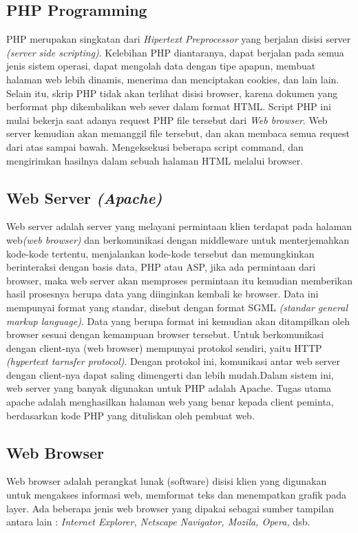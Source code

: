 \documentclass{jtetiproposalskripsi}
\begin{document}
\subsection{PHP Programming }
PHP merupakan singkatan dari \textit{Hipertext Preprocessor} yang berjalan disisi server \textit{(server side scripting)}. Kelebihan PHP diantaranya, dapat berjalan pada semua jenis sistem operasi, dapat mengolah data dengan tipe apapun, membuat halaman web lebih dinamis, menerima dan menciptakan cookies, dan lain lain. Selain itu, skrip PHP tidak akan terlihat disisi browser, karena dokumen yang berformat php dikembalikan web sever dalam format HTML. 
Script PHP ini mulai bekerja saat adanya request PHP file tersebut dari \textit{Web browser}. Web server kemudian akan memanggil file tersebut, dan akan membaca semua request dari atas sampai bawah. Mengeksekusi beberapa script command, dan mengirimkan hasilnya dalam sebuah halaman HTML melalui browser. 
\subsection{Web Server \textit{(Apache)} }
Web server adalah server yang melayani permintaan klien terdapat pada halaman web\textit{(web browser)} dan berkomunikasi dengan middleware untuk menterjemahkan kode-kode tertentu, menjalankan kode-kode tersebut dan memungkinkan berinteraksi dengan basis data, PHP atau ASP, jika ada permintaan dari browser, maka web server akan memproses permintaan itu kemudian memberikan hasil prosesnya berupa data yang diinginkan kembali ke browser. Data ini mempunyai format yang standar, disebut dengan format SGML \textit{(standar general markup language)}. Data yang berupa format ini kemudian akan ditampilkan oleh browser sesuai dengan kemampuan browser tersebut. Untuk berkomunikasi dengan client-nya (web browser) mempunyai protokol sendiri, yaitu HTTP \textit{(hypertext tarnsfer protocol)}. Dengan protokol ini, komunikasi antar web server dengan client-nya dapat saling dimengerti dan lebih mudah.Dalam sistem ini, web server yang banyak digunakan untuk PHP adalah Apache. Tugas utama apache adalah menghasilkan halaman web yang benar kepada client peminta, berdasarkan kode PHP yang dituliskan oleh pembuat web.
\subsection{Web Browser }
Web browser adalah perangkat lunak (software) disisi klien yang digunakan untuk mengakses informasi web, memformat teks dan menempatkan grafik pada layer. Ada beberapa jenis web browser yang dipakai sebagai sumber tampilan antara lain : \textit{Internet Explorer, Netscape Navigator, Mozila, Opera,} dsb.
\end{document}
